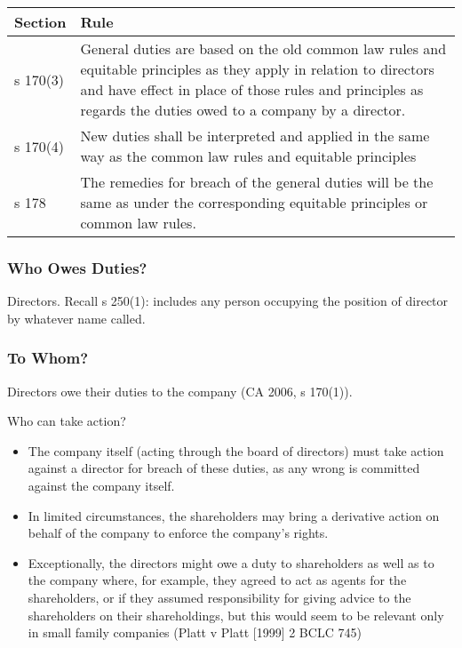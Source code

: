 \documentclass[
]{article}
\providecommand{\tightlist}{%
  \setlength{\itemsep}{0pt}\setlength{\parskip}{0pt}}
\newenvironment{env-55e08dc8-8a40-49e4-9d74-9e25a9308fa4}
{
    \savenotes\tcolorbox[blanker,breakable,left=5pt,borderline west={2pt}{-4pt}{gray}]
}
{
    \endtcolorbox\spewnotes
}
\begin{document}
\begin{longtable}[]{@{}ll@{}}
\toprule()
Section & Rule \\
\midrule()
\endhead
s 170(3) & General duties are based on the old common law rules and
equitable principles as they apply in relation to directors and have
effect in place of those rules and principles as regards the duties owed
to a company by a director. \\
s 170(4) & New duties shall be interpreted and applied in the same way
as the common law rules and equitable principles \\
s 178 & The remedies for breach of the general duties will be the same
as under the corresponding equitable principles or common law rules. \\
\bottomrule()
\end{longtable}

\hypertarget{who-owes-duties}{%
\subsubsection{Who Owes Duties?}\label{who-owes-duties}}

Directors. Recall s 250(1): includes any person occupying the position
of director by whatever name called.

\hypertarget{to-whom}{%
\subsubsection{To Whom?}\label{to-whom}}

Directors owe their duties to the company (CA 2006, s 170(1)).

\begin{env-55e08dc8-8a40-49e4-9d74-9e25a9308fa4}

Who can take action?

\begin{itemize}
\tightlist
\item
  The company itself (acting through the board of directors) must take
  action against a director for breach of these duties, as any wrong is
  committed against the company itself.
\item
  In limited circumstances, the shareholders may bring a derivative
  action on behalf of the company to enforce the company's rights.
\item
  Exceptionally, the directors might owe a duty to shareholders as well
  as to the company where, for example, they agreed to act as agents for
  the shareholders, or if they assumed responsibility for giving advice
  to the shareholders on their shareholdings, but this would seem to be
  relevant only in small family companies (Platt v Platt {[}1999{]} 2
  BCLC 745)
\end{itemize}

\end{env-55e08dc8-8a40-49e4-9d74-9e25a9308fa4}
\end{document}
